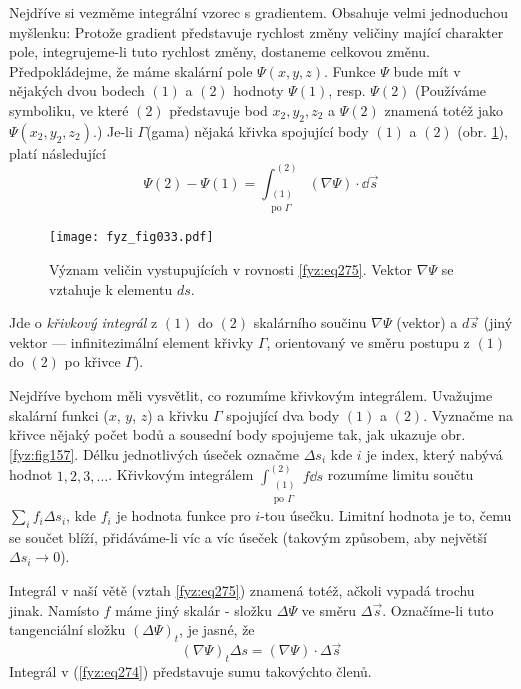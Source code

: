 {    Nejdříve si vezměme integrální vzorec s gradientem. Obsahuje velmi jednoduchou myšlenku: 
    Protože gradient představuje rychlost změny veličiny mající charakter pole, inte\-gru\-jeme-li 
    tuto rychlost změny, dostaneme celkovou změnu. Předpokládejme, že máme skalární pole \(\Psi(x, 
    y, z)\). Funkce \(\Psi\) bude mít v nějakých dvou bodech \((1)\) a \((2)\) hodnoty \(\Psi(1)\), 
    resp. \(\Psi(2)\) (Používáme symboliku, ve které \((2)\) představuje bod \(x_2, y_2, z_2\) a 
    \(\Psi(2)\) znamená totéž jako \(\Psi(x_2, y_2, z_2)\).) Je-li \(\Gamma\)(gama) nějaká 
    křivka spojující body \((1)\) a \((2)\) (obr. \ref{fyz:fig033}), platí následující
    \begin{equation}\label{fyz:eq275}
      \Psi(2)-\Psi(1) = \int_{\substack{(1)\\\text{po }\Gamma}}^{(2)}(\nabla\Psi)\cdot\dd{\vec{s}}
    \end{equation} 

    \begin{figure}[ht!]  %
      \centering
      \texttt{[image: fyz\_fig033.pdf]}
      \caption{Význam veličin vystupujících v rovnosti \ref{fyz:eq275}. Vektor 
               \(\nabla\Psi\) se vztahuje k elementu \(ds\).}
      \label{fyz:fig033}
    \end{figure}
    Jde o \emph{křivkový integrál} z \((1)\) do \((2)\) skalárního součinu \(\nabla\Psi\) (vektor) a
    \(d\vec{s}\) (jiný vektor — infinitezimální element křivky \(\Gamma\), orientovaný ve směru  
    postupu z \((1)\) do \((2)\) po křivce \(\Gamma\)).
    
    Nejdříve bychom měli vysvětlit, co rozumíme křivkovým integrálem. Uvažujme skalární funkci 
    (\(x\), \(y\), \(z\)) a křivku \(\Gamma\) spojující dva body \((1)\) a \((2)\). Vyznačme na 
    křivce nějaký počet bodů a sousední body spojujeme tak, jak ukazuje obr.  \ref{fyz:fig157}. 
    Délku jednotlivých úseček označme \(\Delta s_i\) kde \(i\) je index, který nabývá hodnot 
    \(1,2,3,\ldots\). Křivkovým integrálem \(\displaystyle\int_{\substack{(1)\\\text{po 
    }\Gamma}}^{(2)}f\dd{s}\) rozumíme limitu součtu \(\displaystyle\sum_i f_i\Delta s_i\), kde 
    \(f_i\) je hodnota funkce pro \(i\)-tou úsečku. Limitní hodnota je to, čemu se součet blíží, 
    přidáváme-li víc a víc úseček (takovým způsobem, aby největší \(\Delta s_i\rightarrow 0\)).
    
    Integrál v naší větě (vztah \ref{fyz:eq275}) znamená totéž, ačkoli vypadá trochu jinak. Namísto 
    \(f\) máme jiný skalár - složku \(\Delta\Psi\) ve směru \(\Delta\vec{s}\). Označíme-li tuto 
    tangenciální složku \((\Delta\Psi)_t\), je jasné, že
    \begin{equation}\label{fyz:eq274}
      (\nabla\Psi)_t\Delta s = (\nabla\Psi)\cdot\Delta\vec{s}
    \end{equation}
    Integrál v (\ref{fyz:eq274}) představuje sumu takovýchto členů.
    
}
